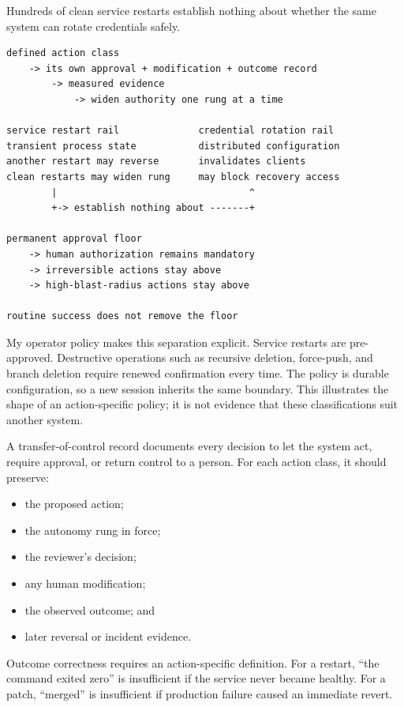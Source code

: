 Hundreds of clean service restarts establish nothing about whether the same system can rotate credentials safely.

\begin{verbatim}
defined action class
    -> its own approval + modification + outcome record
        -> measured evidence
            -> widen authority one rung at a time

service restart rail              credential rotation rail
transient process state           distributed configuration
another restart may reverse       invalidates clients
clean restarts may widen rung     may block recovery access
        |                                  ^
        +-> establish nothing about -------+

permanent approval floor
    -> human authorization remains mandatory
    -> irreversible actions stay above
    -> high-blast-radius actions stay above

routine success does not remove the floor
\end{verbatim}

My operator policy makes this separation explicit. Service restarts are pre-approved. Destructive operations such as recursive deletion, force-push, and branch deletion require renewed confirmation every time. The policy is durable configuration, so a new session inherits the same boundary. This illustrates the shape of an action-specific policy; it is not evidence that these classifications suit another system.

A transfer-of-control record documents every decision to let the system act, require approval, or return control to a person. For each action class, it should preserve:

\begin{itemize}
\tightlist
\item
  the proposed action;
\item
  the autonomy rung in force;
\item
  the reviewer's decision;
\item
  any human modification;
\item
  the observed outcome; and
\item
  later reversal or incident evidence.
\end{itemize}

Outcome correctness requires an action-specific definition. For a restart, ``the command exited zero'' is insufficient if the service never became healthy. For a patch, ``merged'' is insufficient if production failure caused an immediate revert.

